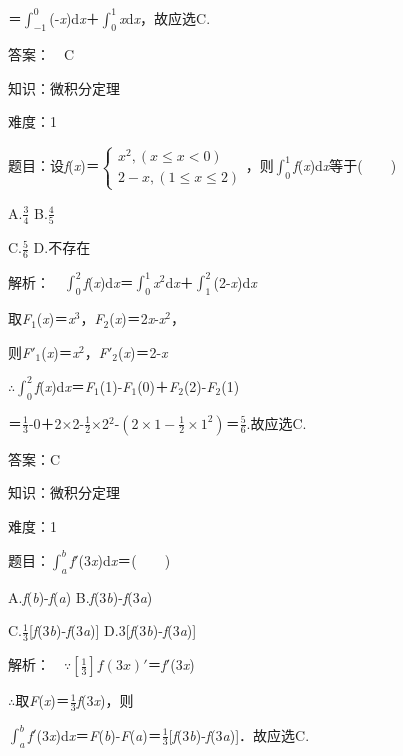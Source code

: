 \documentclass{article} %
\begin{document}
＝$\int_{-1}^{0}$(-\textit{x})d\textit{x}＋$\int_{0}^{1}$\textit{x}d\textit{x}，故应选C.

 答案：　C

 

 知识：微积分定理

 难度：1

 题目：设\textit{f}(\textit{x})＝$\left\{\begin{array}{l} x^2, (x\le x<0)\\2-x, (1\le x\le 2)\end{array}\right.$，则$\int_0^1$\textit{f}(\textit{x})d\textit{x}等于(　　)

A.$\frac{3}{4}$        B.$\frac{4}{5}$

C.$\frac{5}{6}$        D.不存在

 解析：　$\int_0^2$\textit{f}(\textit{x})d\textit{x}＝$\int_0^1$\textit{x}${}^{2}$d\textit{x}＋$\int_1^2$(2-\textit{x})d\textit{x}

取\textit{F}${}_{1}$(\textit{x})＝\textit{x}${}^{3}$，\textit{F}${}_{2}$(\textit{x})＝2\textit{x}-\textit{x}${}^{2}$，

则\textit{F}$'$${}_{1}$(\textit{x})＝\textit{x}${}^{2}$，\textit{F}$'$${}_{2}$(\textit{x})＝2-\textit{x}

$\mathrm{\therefore}$$\int_0^2$\textit{f}(\textit{x})d\textit{x}＝\textit{F}${}_{1}$(1)-\textit{F}${}_{1}$(0)＋\textit{F}${}_{2}$(2)-\textit{F}${}_{2}$(1)

＝$\frac{1}{3}$-0＋2$\mathrm{\times}$2-$\frac{1}{2}\mathrm{\times}$2${}^{2}$-$(2\times 1-\frac{1}{2}\times 1^2)$＝$\frac{5}{6}$.故应选C.

 答案：C



 知识：微积分定理

 难度：1

 题目：$\int_a^b$\textit{f}$'$(3\textit{x})d\textit{x}＝(　　)

A.\textit{f}(\textit{b})-\textit{f}(\textit{a})      B.\textit{f}(3\textit{b})-\textit{f}(3\textit{a})

C.$\frac{1}{3}$[\textit{f}(3\textit{b})-\textit{f}(3\textit{a})]      D.3[\textit{f}(3\textit{b})-\textit{f}(3\textit{a})]

 解析：　$\mathrm{\because}[\frac{1}{3}]f(3x)$$'$＝\textit{f}$'$(3\textit{x})

$\mathrm{\therefore}$取\textit{F}(\textit{x})＝$\frac{1}{3}$\textit{f}(3\textit{x})，则

$\int_a^b$\textit{f}$'$(3\textit{x})d\textit{x}＝\textit{F}(\textit{b})-\textit{F}(\textit{a})＝$\frac{1}{3}$[\textit{f}(3\textit{b})-\textit{f}(3\textit{a})]．故应选C.
\end{document}
